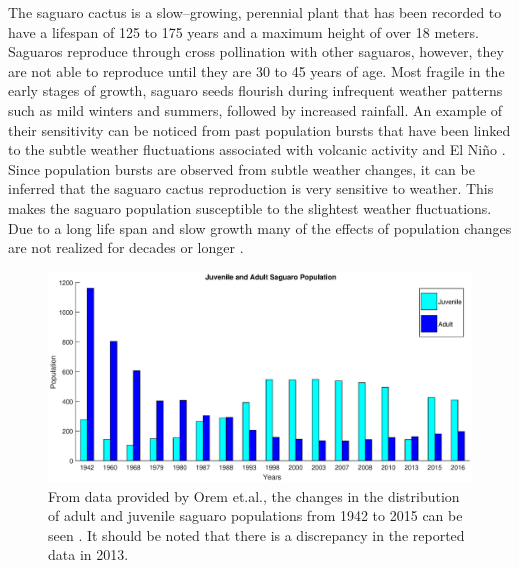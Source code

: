 \documentclass[a4paper]{article}
\begin{document}
The saguaro cactus is a slow--growing, perennial plant that has been recorded to have a lifespan of 125 to 175 years and a maximum height of over 18 meters. Saguaros reproduce through cross pollination with other saguaros, however, they are not able to reproduce until they are 30 to 45 years of age. Most fragile in the early stages of growth, saguaro seeds flourish during infrequent weather patterns such as mild winters and summers, followed by increased rainfall. An example of their sensitivity can be noticed from past population bursts that have been linked to the subtle weather fluctuations associated with volcanic activity and El Ni\~{n}o \cite{volcano}. Since population bursts are observed from subtle weather changes, it can be inferred that the saguaro cactus reproduction is very sensitive to weather. This makes the saguaro population susceptible to the slightest weather fluctuations. Due to a long life span and slow growth many of the effects of population changes are not realized for decades or longer \cite{85yr}.
\begin{figure}[H]
\hspace{-2cm}
\includegraphics[scale=.55]{populationData.eps}
\caption{From data provided by Orem et.al., the changes in the distribution of adult and juvenile saguaro populations from 1942 to 2015 can be seen \cite{OrumData}. It should be noted that there is a discrepancy in the reported data in 2013.}
\label{fig:PopData}
\end{figure}
\end{document}
